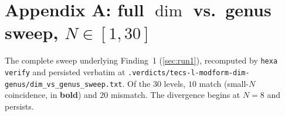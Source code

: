 \documentclass[11pt,a4paper]{article}
\theoremstyle{definition}
\begin{document}



\appendix

\section{Appendix A: full $\dim$ vs.\ genus sweep, $N\in[1,30]$}
\label{app:dimgenus}

The complete sweep underlying Finding~1 (\textsection\ref{sec:run1}), recomputed
by \texttt{hexa verify} and persisted verbatim at
\texttt{.verdicts/tecs-l-modform-dim-genus/dim\_vs\_genus\_sweep.txt}. Of the
$30$ levels, $10$ match (small-$N$ coincidence, in \textbf{bold}) and $20$
mismatch. The divergence begins at $N=8$ and persists.
\end{document}
